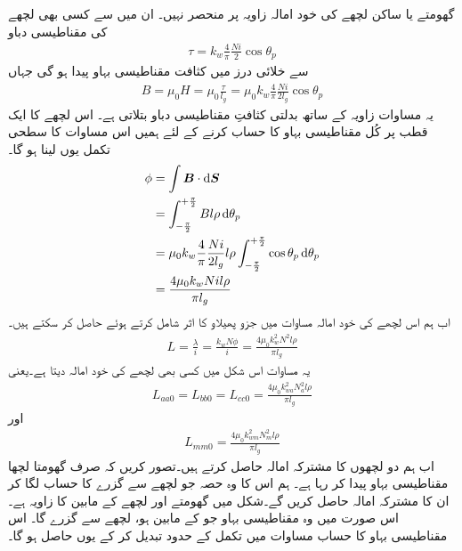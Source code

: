 گھومتے یا ساکن لچھے کی خود امالہ  زاویہ  پر منحصر نہیں۔ ان میں سے کسی بھی لچھے کی مقناطیسی دباو  
\begin{align}
\tau=k_w \frac{4}{\pi}\frac{N i}{2} \cos \theta_p
\end{align}
سے خلائی درز میں کثافت مقناطیسی بہاو   پیدا ہو گی جہاں	
\begin{align}
B=\mu_0 H=\mu_0 \frac{\tau}{l_g}=\mu_0 k_w \frac{4}{\pi}\frac{N i}{2 l_g} \cos \theta_p
\end{align}
یہ مساوات زاویہ  کے ساتھ بدلتی کثافتِ مقناطیسی دباو  بتلاتی ہے۔ اس لچھے کا ایک قطب پر  کُل مقناطیسی بہاو  کا حساب کرنے کے لئے ہمیں اس مساوات کا سطحی تکمل یوں لینا ہو گا۔
\begin{gather}
\begin{aligned}\label{مساوات_معاصر_بہاو_بذریع_سطحی_تکمل}
\phi&=\int \kvec{B} \cdot \dif \kvec{S}\\
&=\int_{-\frac{\pi}{2}}^{+\frac{\pi}{2}} B l \rho \dif \theta_p\\
&=\mu_0 k_w \frac{4}{\pi}\frac{N i}{2 l_g} l \rho \int_{-\frac{\pi}{2}}^{+\frac{\pi}{2}}  \cos  \theta_p \dif \theta_p\\
&=\frac{4 \mu_0 k_w N i l \rho}{\pi l_g}
\end{aligned}
\end{gather}
اب ہم اس لچھے کی خود امالہ  مساوات  میں جزو پھیلاو  کا اثر شامل کرتے ہوئے  حاصل کر سکتے ہیں۔
\begin{align}
L=\frac{\lambda}{i}=\frac{k_w N \phi}{i}=\frac{4 \mu_0 k_w^2 N^2  l \rho}{\pi l_g}
\end{align}
یہ مساوات اس شکل میں کسی بھی لچھے کی خود امالہ دیتا ہے۔یعنی
\begin{align}\label{مساوات_معاصر_تین_ساکن_امالہ_برابر}
L_{aa0}=L_{bb0}=L_{cc0}=\frac{4 \mu_0 k_{wa}^2 N_a^2  l \rho}{\pi l_g}
\end{align}
اور
\begin{align}
L_{mm0}=\frac{4 \mu_0 k_{wm}^2 N_m^2  l \rho}{\pi l_g}
\end{align}
اب ہم دو لچھوں کا مشترکہ امالہ حاصل کرتے ہیں۔تصور کریں کہ صرف  گھومتا لچھا مقناطیسی بہاو پیدا کر رہا ہے۔ ہم اس کا وہ حصہ جو  لچھے  سے گزرے کا حساب لگا کر ان کا مشترکہ امالہ حاصل کریں گے۔شکل   میں گھومتے اور  لچھے کے مابین کا زاویہ  ہے۔اس صورت میں وہ مقناطیسی بہاو جو  کے مابین ہو،  لچھے سے گزرے گا۔ اس مقناطیسی بہاو کا حساب مساوات   میں تکمل کے حدود تبدیل کر کے یوں حاصل ہو گا۔
